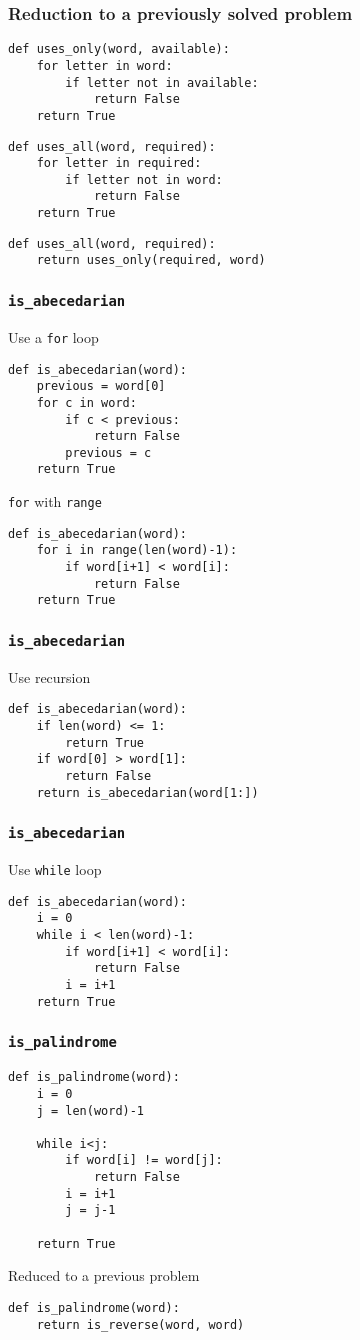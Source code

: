 \documentclass{beamer}
\newcommand{\bfr}[1]{\begin{frame}[fragile]\frametitle{{ #1 }}}
\begin{document}
\bfr{Reduction to a previously solved problem}
\begin{lstlisting}
def uses_only(word, available):
    for letter in word: 
        if letter not in available:
            return False
    return True
\end{lstlisting}
\begin{lstlisting}
def uses_all(word, required):
    for letter in required: 
        if letter not in word:
            return False
    return True
\end{lstlisting}
\pause
\begin{lstlisting}
def uses_all(word, required):
    return uses_only(required, word)
\end{lstlisting}
\end{frame}

\bfr{\tt is\_abecedarian}
Use a {\tt for} loop
\pause
\begin{lstlisting}
def is_abecedarian(word):
    previous = word[0]
    for c in word:
        if c < previous:
            return False
        previous = c
    return True
\end{lstlisting}
\pause
{\tt for} with {\tt range}
\begin{lstlisting}
def is_abecedarian(word):
    for i in range(len(word)-1):
        if word[i+1] < word[i]:
            return False
    return True
\end{lstlisting}
\end{frame}

\bfr{\tt is\_abecedarian}
Use recursion
\pause
\begin{lstlisting}
def is_abecedarian(word):
    if len(word) <= 1:
        return True
    if word[0] > word[1]:
        return False
    return is_abecedarian(word[1:])
\end{lstlisting}
\end{frame}

\bfr{\tt is\_abecedarian}
Use {\tt while} loop
\pause
\begin{lstlisting}
def is_abecedarian(word):
    i = 0
    while i < len(word)-1:
        if word[i+1] < word[i]:
            return False
        i = i+1
    return True
\end{lstlisting}
\end{frame}

\bfr{{\tt is\_palindrome} }

\begin{lstlisting}
def is_palindrome(word):
    i = 0
    j = len(word)-1

    while i<j:
        if word[i] != word[j]:
            return False
        i = i+1
        j = j-1

    return True
\end{lstlisting}
\pause
Reduced to a previous problem
\begin{lstlisting}
def is_palindrome(word):
    return is_reverse(word, word)
\end{lstlisting}
\end{frame}
\end{document}
